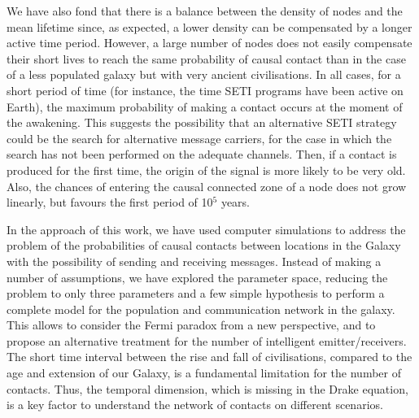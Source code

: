 \documentclass[crop]{CSLB}
\newcommand{\ceti}{node}
\newcommand{\cetis}{nodes}
\begin{document}
We have also fond that there is a balance between the density of
\cetis{} and the mean lifetime since, as expected, a lower density can
be compensated by a longer active time period.
%
However, a large number of nodes does not easily compensate their
short lives to reach the same probability of causal contact than in
the case of a less populated galaxy but with very ancient
civilisations.
%
In all cases, for a short period of time (for instance, the time SETI
programs have been active on Earth), the maximum probability of making
a contact occurs at the moment of the awakening.
%
This suggests the possibility that an alternative SETI strategy could
be the search for alternative message carriers, for the case in which
the search has not been performed on the adequate channels.
%
Then, if a contact is produced for the first time, the origin of the
signal is more likely to be very old.
%
Also, the chances of entering the causal connected zone of a \ceti{}
does not grow linearly, but favours the first period of 10$^5$ years.


In the approach of this work, we have used computer simulations to address
the problem of the probabilities of causal contacts between locations
in the Galaxy with the possibility of sending and receiving messages.
%
Instead of making a number of assumptions, we have explored the
parameter space, reducing the problem to only three parameters and a
few simple hypothesis to perform a complete model for the population and
communication network in the galaxy.
%
This allows to consider the Fermi paradox from a new perspective, and
to propose an alternative treatment for the number of intelligent
emitter/receivers.
%
The short time interval between the
rise and fall of civilisations, compared to the age and extension of
our Galaxy, is a fundamental limitation for the number of contacts.
%
Thus, the temporal dimension, which is missing in the Drake
equation, is a key factor to understand the network of contacts on
different scenarios.


\end{document}
